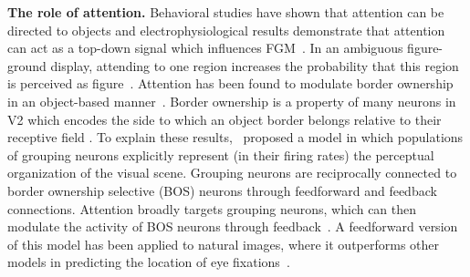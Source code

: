 \documentclass[11pt]{article}
\begin{document}
\textbf{The role of attention.}  Behavioral studies have shown that
attention can be directed to objects \citep{Egly_etal94} and
electrophysiological results demonstrate that attention can act as a
top-down signal which influences FGM~\citep{Qiu_etal07,
  Poort_etal12}. In an ambiguous figure-ground display, attending to
one region increases the probability that this region is perceived as
figure~\citep{Driver_Baylis96, Vecera_etal04}.
%
Attention has been found to modulate border ownership in an object-based manner~\citep{Qiu_etal07}.
Border ownership is a property of many
    neurons in V2 which encodes the side to which an object border
    belongs 
relative to their receptive field
    \citep{Zhou_etal00}. To explain these
results,~\citet{Craft_etal07} proposed a model in which populations of
grouping neurons explicitly represent (in their firing rates) the
perceptual organization of the visual scene. Grouping neurons are
reciprocally connected to border ownership selective (BOS) neurons
through feedforward and feedback connections. Attention broadly
targets grouping neurons, which can then modulate the activity of BOS
neurons through
feedback~\citep{Mihalas_etal11b}. 
A feedforward version of this model has been
    applied to natural images, where it outperforms other
models in predicting the location of eye
fixations~\citep{Russell_etal14}.
\end{document}
